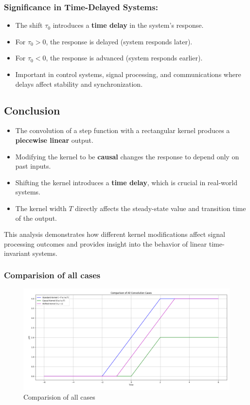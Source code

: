 \subsubsection{Significance in Time-Delayed Systems:}
\begin{itemize}
    \item The shift \( \tau_0 \) introduces a \textbf{time delay} in the system's response.
    \item For \( \tau_0 > 0 \), the response is delayed (system responds later).
    \item For \( \tau_0 < 0 \), the response is advanced (system responds earlier).
    \item Important in control systems, signal processing, and communications where delays affect stability and synchronization.
\end{itemize}

\subsection{Conclusion}

\begin{itemize}
    \item The convolution of a step function with a rectangular kernel produces a \textbf{piecewise linear} output.
    \item Modifying the kernel to be \textbf{causal} changes the response to depend only on past inputs.
    \item Shifting the kernel introduces a \textbf{time delay}, which is crucial in real-world systems.
    \item The kernel width \( T \) directly affects the steady-state value and transition time of the output.
\end{itemize}

This analysis demonstrates how different kernel modifications affect signal processing outcomes and provides insight into the behavior of linear time-invariant systems.
\subsubsection{Comparision of all cases}
\begin{figure}[H]
    \centering
    \includegraphics[width=0.8\linewidth]{codes/codes_step/plotsstep/comparsionof123.png}
    \caption{Comparision of all cases}
    \label{fig:enter-label}
\end{figure}
